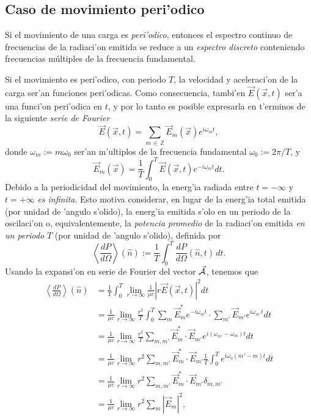 \subsection{Caso de movimiento peri'odico}\label{sec:rfp}


Si el movimiento de una carga es \textit{peri'odico}, entonces el
espectro continuo de frecuencias de la radiaci'on emitida se reduce a un
\textit{espectro discreto} conteniendo frecuencias m\'{u}ltiples de la frecuencia
fundamental.

Si el movimiento es peri'odico, con periodo $T$, la velocidad y aceleraci'on de la carga ser'an funciones peri'odicas. Como consecuencia, tambi'en $\vec{E}(\vec{x},t)$ ser'a una funci'on peri'odica en $t$, y por lo tanto es posible expresarla en t'erminos de la siguiente \textit{serie de Fourier}
\begin{equation}
\vec{E}(\vec{x},t) =\sum_{m\,\in\, \mathbb{Z}} \vec{E}_{m}(\vec{x})e^{i\omega_{m}t},
\end{equation}
donde $\omega_{m}:=m\omega_0$ ser'an m'ultiplos de la frecuencia
fundamental $\omega_0:={2\pi}/{T}$, y
\begin{equation}
\vec{E}_{m}(\vec{x}) =\frac{1}{T}\int_0^{T}\vec{E}(\vec{x},t) e^{-i\omega_{m}t}dt. \label{defAm}
\end{equation}
Debido a la periodicidad del movimiento, la energ'ia radiada entre $t=-\infty$ y $t=+\infty$ \textit{es infinita}. Esto motiva considerar, en lugar de la energ'ia  total emitida (por unidad de 'angulo s'olido), la energ'ia emitida s'olo en un periodo de la oscilaci'on o, equivalentemente, la \textit{potencia promedio} de la radiaci'on emitida \textit{en un periodo} $T$ (por unidad de 'angulo s'olido), definida por
\begin{equation}
\left\langle \frac{dP}{d\Omega}\right\rangle (\hat{n}) :=\frac{1}{T}\int_0^{T}\frac{dP}{d\Omega}(\hat{n},t)\,dt.
\end{equation}
Usando la expansi'on en serie de Fourier del vector $\vec{\cal A}$, tenemos que
\begin{align}
\left\langle \frac{dP}{d\Omega}\right\rangle (\hat{n})&
=\frac{1}{T}\int_0^{T}\lim_{r\to\infty}\frac{1}{\mu c}\left|r \vec{E}(\vec{x},t)\right|^2dt\\
&  =\frac{1}{\mu c}\lim_{r\to\infty}\frac{r^2}{T}\int_0^{T}\sum_{m}\vec{E}_{m}^*e^{-i\omega_{m}t}\cdot\sum_{m'}\vec{E}_{m'}e^{i\omega_{m'}t}dt\\
&  =\frac{1}{\mu c}\lim_{r\to\infty}\frac{r^2}{T}\sum_{m,m' }\vec{E}_{m}^*\cdot\vec{E}_{m'}e^{i\left(\omega_{m'}-\omega_{m}\right)  t}dt\\
&  =\frac{1}{\mu c}\lim_{r\to\infty}r^2 \sum_{m,m'}\vec{E}_{m}^*\cdot\vec{E}_{m'}\frac{1}{T}
\int_0^{T}e^{i\omega_0\left(m'-m\right)  t}dt\\
&  =\frac{1}{\mu c}\lim_{r\to\infty}r^2\sum_{m,m' }\vec{E}_{m}^*\cdot\vec{E}_{m' }\delta_{m,m'}\\
&  =\frac{1}{\mu c}\lim_{r\to\infty}r^2\sum_{m}\left|\vec{E}_{m}\right|^2,
\end{align}
